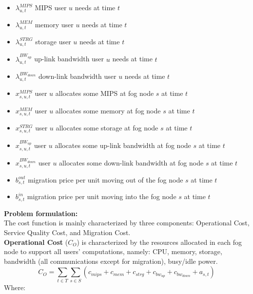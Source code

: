 \documentclass{article}
\begin{document}
\begin{itemize}
    \item $\lambda^{MIPS}_{u,t}$ MIPS user $u$ needs at time $t$
    \item $\lambda^{MEM}_{u,t}$ memory user $u$ needs at time $t$
    \item $\lambda^{STRG}_{u,t}$ storage user $u$ needs at time $t$
    \item $\lambda^{BW_{up}}_{u,t}$ up-link bandwidth user $u$ needs at time $t$
    \item $\lambda^{BW_{down}}_{u,t}$ down-link bandwidth user $u$ needs at time $t$\\
    
    \item $x^{MIPS}_{s,u,t}$ user $u$ allocates some MIPS at fog node $s$ at time $t$
    \item $x^{MEM}_{s,u,t}$ user $u$ allocates some memory at fog node $s$ at time $t$
    \item $x^{STRG}_{s,u,t}$ user $u$ allocates some storage at fog node $s$ at time $t$
    \item $x^{BW_{up}}_{s,u,t}$ user $u$ allocates some up-link bandwidth at fog node $s$ at time $t$
    \item $x^{BW_{down}}_{s,u,t}$ user $u$ allocates some down-link bandwidth at fog node $s$ at time $t$\\
    
    \item $b^{out}_{s,t}$ migration price per unit moving out of the fog node $s$ at time $t$
    \item $b^{in}_{s,t}$ migration price per unit moving into the fog node $s$ at time $t$
\end{itemize}

\pagebreak
\noindent\textbf{Problem formulation:}\\[6pt]
The cost function is mainly characterized by three components: Operational Cost, Service Quality Cost, and Migration Cost.\\[6pt]

\noindent\textbf{Operational Cost} ($C_O$) is characterized by the resources allocated in each fog node to support all users' computations, namely: CPU, memory, storage, bandwidth (all communications except for migration), busy/idle power.
\begin{equation}
    C_O = \sum_{t \in T} \sum_{s \in S} \left( c_{mips} + c_{mem} + c_ {strg} + c_{bw_{up}}+ c_{bw_{down}} + a_{s,t}\right)
\end{equation}
Where:
\end{document}
